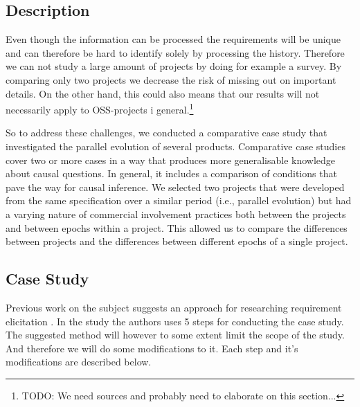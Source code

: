 \documentclass[a4paper,11pt]{article}
\begin{document}
{\subsection{Description}



	

Even though the information can be processed the requirements will be unique and can therefore be hard to identify solely by processing the history. Therefore we can not study a large amount of projects by doing for example a survey. By comparing only two projects we decrease the risk of missing out on important details. On the other hand, this could also means that our results will not necessarily apply to OSS-projects i general.\footnote{TODO: We need sources and probably need to elaborate on this section...}

So to address these challenges, we conducted a comparative case study that investigated the parallel evolution of several products. Comparative case studies cover two or more cases in a way that produces more generalisable knowledge about causal questions\cite{Goodrick2014}. In general, it includes a comparison of conditions that pave the way for causal inference. We selected two projects that were developed from the same specification over a similar period (i.e., parallel evolution) but had a varying nature of commercial involvement practices both between the projects and between epochs within a project. This allowed us to compare the differences between projects and the differences between different epochs of a single project. 


\subsection{Case Study}
Previous work on the subject suggests an approach for researching requirement elicitation \cite{Noll}. In the study the authors uses 5 steps for conducting the case study. The suggested method will however to some extent limit the scope of the study. And therefore we will do some modifications to it. Each step and it's modifications are described below.

}
\end{document}
